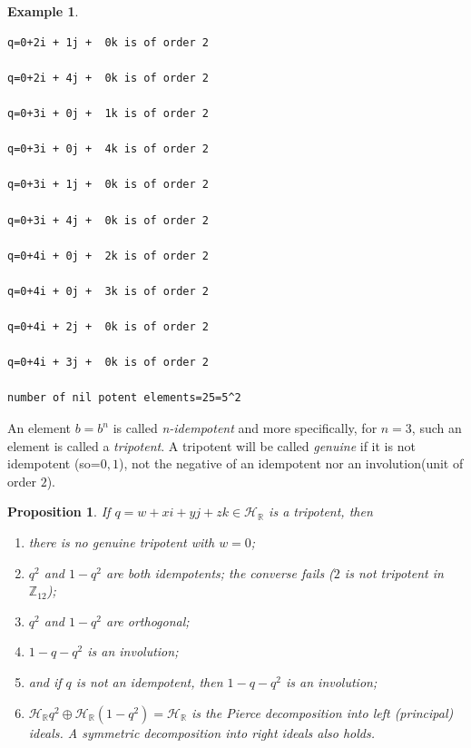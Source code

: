 \documentclass[sn-mathphys,Numbered]{sn-jnl}%
\theoremstyle{thmstyleone}
\newtheorem{proposition}[theorem]{Proposition}
\theoremstyle{thmstyletwo}
\newtheorem{example}{Example}
\theoremstyle{thmstylethree}
\begin{document}
\begin{example}
\begin{verbatim}
q=0+2i + 1j +  0k is of order 2

q=0+2i + 4j +  0k is of order 2

q=0+3i + 0j +  1k is of order 2

q=0+3i + 0j +  4k is of order 2

q=0+3i + 1j +  0k is of order 2

q=0+3i + 4j +  0k is of order 2

q=0+4i + 0j +  2k is of order 2

q=0+4i + 0j +  3k is of order 2

q=0+4i + 2j +  0k is of order 2

q=0+4i + 3j +  0k is of order 2

number of nil potent elements=25=5^2
\end{verbatim}
\end{example}
An element $b = b^{n}$ is called \textit{n-idempotent} and more specifically, for $n = 3$, such an element
is called a \textit{tripotent}. A tripotent will be called \textit{genuine}
if it is not idempotent (so=$ 0,1$), not the negative of an idempotent nor an involution(unit of order $2$).
\begin{proposition} \cite{gc}
If  $q=w+xi+yj+zk \in \mathcal{H_{\mathbb{R}}}$  is a tripotent, then
\begin{enumerate}
  \item there is no genuine tripotent with $w=0$; \\
  \item $q^{2}$ and $1-q^{2}$ are both idempotents; the converse fails ($2$ is not tripotent in $\mathbb{Z}_{12}$); \\
  \item $q^{2}$ and $1-q^{2}$ are orthogonal; \\
  \item $1 -q -q^{2}$ is an involution; \\
  \item  and if $q$ is not an idempotent, then $1 -q -q^{2}$ is an involution; \\
  \item $\mathcal{H_{\mathbb{R}}}q^{2}\oplus\mathcal{H_{\mathbb{R}}}(1-q^{2}) = \mathcal{H_{\mathbb{R}}}$ is the Pierce decomposition into left (principal) ideals. A symmetric decomposition into right ideals also holds.
\end{enumerate}
\end{proposition}
\end{document}
